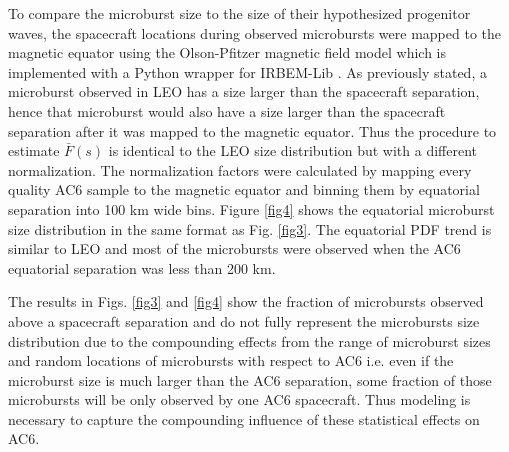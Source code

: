 \documentclass[draft]{agujournal2019}
\begin{document}
To compare the microburst size to the size of their hypothesized progenitor waves, the spacecraft locations during observed microbursts were mapped to the magnetic equator using the Olson-Pfitzer magnetic field model \cite{Olson1982} which is implemented with a Python wrapper for IRBEM-Lib \cite{irbem}. As previously stated, a microburst observed in LEO has a size larger than the spacecraft separation, hence that microburst would also have a size larger than the spacecraft separation after it was mapped to the magnetic equator. Thus the procedure to estimate $\bar{F}(s)$ is identical to the LEO size distribution but with a different normalization. The normalization factors were calculated by mapping every quality AC6 sample to the magnetic equator and binning them by equatorial separation into 100 km wide bins. Figure \ref{fig4} shows the equatorial microburst size distribution in the same format as Fig. \ref{fig3}. The equatorial PDF trend is similar to LEO and most of the microbursts were observed when the AC6 equatorial separation was less than 200 km. 

The results in Figs. \ref{fig3} and \ref{fig4} show the fraction of microbursts observed above a spacecraft separation and do not fully represent the microbursts size distribution due to the compounding effects from the range of microburst sizes and random locations of microbursts with respect to AC6 i.e. even if the microburst size is much larger than the AC6 separation, some fraction of those microbursts will be only observed by one AC6 spacecraft. Thus modeling is necessary to capture the compounding influence of these statistical effects on AC6.
\end{document}
